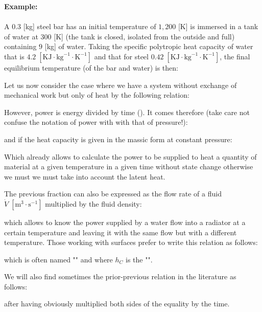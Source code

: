 	\begin{tcolorbox}[colframe=black,colback=white,sharp corners]
	\textbf{{\Large {}}Example:}\\\\
	A $0.3$ [kg] steel bar has an initial temperature of $1,200$ [K] is immersed in a tank of water at $300$ [K] (the tank is closed, isolated from the outside and full) containing $9$ [kg] of water. Taking the specific polytropic heat capacity of water that is $4.2\;[\text{KJ}\cdot\text{kg}^{-1}\cdot \text{K}^{-1}]$  and that for steel $0.42\;[\text{KJ}\cdot\text{kg}^{-1}\cdot \text{K}^{-1}]$, the final equilibrium temperature (of the bar and water) is then:
	
	\end{tcolorbox}
	Let us now consider the case where we have a system without exchange of mechanical work but only of heat by the following relation:
	
	However, power is energy divided by time (). It comes therefore (take care not confuse the notation of power with with that of pressure!):
	
	and if the heat capacity is given in the massic form at constant pressure:
	
	Which already allows to calculate the power to be supplied to heat a quantity of material at a given temperature in a given time without state change otherwise we must we must take into account the latent heat.

	The previous fraction can also be expressed as the flow rate of a fluid $\dot{V}\;[\text{m}^3\cdot\text{s}^{-1}]$ multiplied by the fluid density:
	
	which allows to know the power supplied by a water flow into a radiator at a certain temperature and leaving it with the same flow but with a different temperature. Those working with surfaces prefer to write this relation as follows:
	
	which is often named "" and where $h_C$ is the "".

	We will also find sometimes the prior-previous relation in the literature as follows:
	
	after having obviously multiplied both sides of the equality by the time.
	

